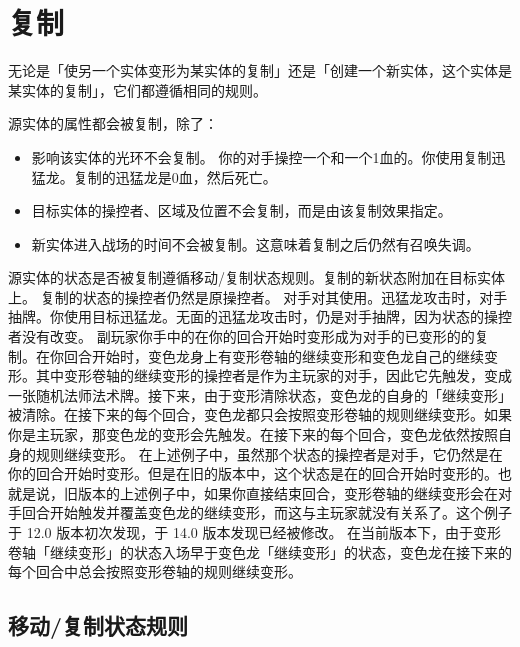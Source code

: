 \section{复制}

无论是「使另一个实体变形为某实体的复制」还是「创建一个新实体，这个实体是某实体的复制」，它们都遵循相同的规则。

源实体的属性都会被复制，除了：
\begin{itemize}
    \item 影响该实体的光环不会复制。
        \example 你的对手操控一个和一个1血的。你使用复制迅猛龙。复制的迅猛龙是0血，然后死亡。
    \item 目标实体的操控者、区域及位置不会复制，而是由该复制效果指定。
    \item 新实体进入战场的时间不会被复制。这意味着复制之后仍然有召唤失调。
\end{itemize}

源实体的状态是否被复制遵循移动/复制状态规则。复制的新状态附加在目标实体上。
\notice 复制的状态的操控者仍然是原操控者。
\example 对手对其使用。迅猛龙攻击时，对手抽牌。你使用目标迅猛龙。无面的迅猛龙攻击时，仍是对手抽牌，因为状态的操控者没有改变。
\example {}副玩家你手中的在你的回合开始时变形成为对手的已变形的的复制。在你回合开始时，变色龙身上有变形卷轴的继续变形和变色龙自己的继续变形。其中变形卷轴的继续变形的操控者是作为主玩家的对手，因此它先触发，变成一张随机法师法术牌。接下来，由于变形清除状态，变色龙的自身的「继续变形」被清除。在接下来的每个回合，变色龙都只会按照变形卷轴的规则继续变形。如果你是主玩家，那变色龙的变形会先触发。在接下来的每个回合，变色龙依然按照自身的规则继续变形。
\notice {}在上述例子中，虽然那个状态的操控者是对手，它仍然是在你的回合开始时变形。但是在旧的版本中，这个状态是在的回合开始时变形的。也就是说，旧版本的上述例子中，如果你直接结束回合，变形卷轴的继续变形会在对手回合开始触发并覆盖变色龙的继续变形，而这与主玩家就没有关系了。这个例子于 12.0 版本初次发现，于 14.0 版本发现已经被修改。
\notice {}在当前版本下，由于变形卷轴「继续变形」的状态入场早于变色龙「继续变形」的状态，变色龙在接下来的每个回合中总会按照变形卷轴的规则继续变形。

\subsection{移动/复制状态规则}

